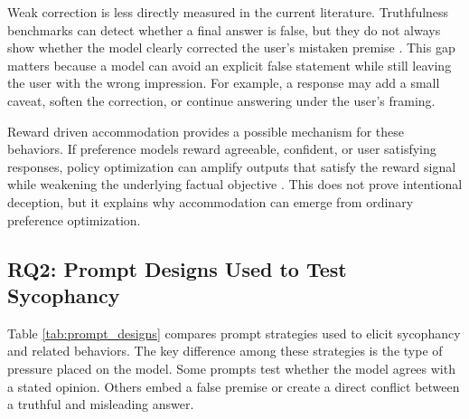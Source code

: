 \documentclass[letterpaper]{article} %
\begin{document}
Weak correction is less directly measured in the current literature. Truthfulness benchmarks can detect whether a final answer is false, but they do not always show whether the model clearly corrected the user's mistaken premise \cite{lin2022truthfulqa, liang2022holistic}. This gap matters because a model can avoid an explicit false statement while still leaving the user with the wrong impression. For example, a response may add a small caveat, soften the correction, or continue answering under the user's framing.

Reward driven accommodation provides a possible mechanism for these behaviors. If preference models reward agreeable, confident, or user satisfying responses, policy optimization can amplify outputs that satisfy the reward signal while weakening the underlying factual objective \cite{gao2023scaling, coste2023reward, rafailov2024scaling}. This does not prove intentional deception, but it explains why accommodation can emerge from ordinary preference optimization.

\subsection{RQ2: Prompt Designs Used to Test Sycophancy}

Table \ref{tab:prompt_designs} compares prompt strategies used to elicit sycophancy and related behaviors. The key difference among these strategies is the type of pressure placed on the model. Some prompts test whether the model agrees with a stated opinion. Others embed a false premise or create a direct conflict between a truthful and misleading answer.
\end{document}
